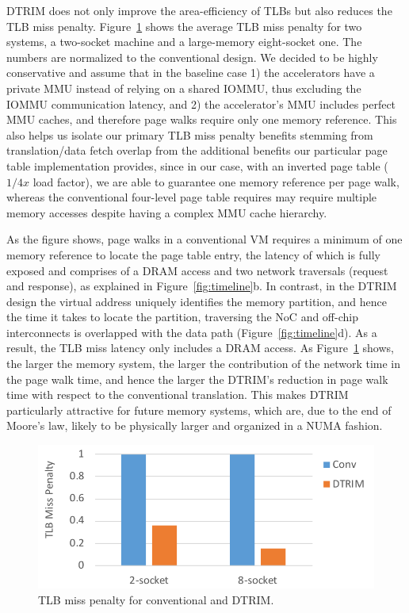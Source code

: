 DTRIM does not only improve the area-efficiency of TLBs but also reduces the TLB miss penalty. Figure~\ref{fig:penalty} shows the average TLB miss penalty for two systems, a two-socket machine and a large-memory eight-socket one. The numbers are normalized to the conventional design. We decided to be highly conservative and assume that in the baseline case 1) the accelerators have a private MMU instead of relying on a shared IOMMU, thus excluding the IOMMU communication latency, and 2) the accelerator's MMU includes perfect MMU caches, and therefore page walks require only one memory reference. This also helps us isolate our primary TLB miss penalty benefits stemming from translation/data fetch overlap from the additional benefits our particular page table implementation provides, since in our case, with an inverted page table ($1/4x$ load factor), we are able to guarantee one memory reference per page walk, whereas the conventional four-level page table requires may require multiple memory accesses despite having a complex MMU cache hierarchy.

As the figure shows, page walks in a conventional VM requires a minimum of one memory reference to locate the page table entry, the latency of which is fully exposed and comprises of a DRAM access and two network traversals (request and response), as explained in Figure~\ref{fig:timeline}b. In contrast, in the DTRIM design the virtual address uniquely identifies the memory partition, and hence the time it takes to locate the partition, traversing the NoC and off-chip interconnects is overlapped with the data path (Figure~\ref{fig:timeline}d). As a result, the TLB miss latency only includes a DRAM access. As Figure~\ref{fig:penalty} shows, the larger the memory system, the larger the contribution of the network time in the page walk time, and hence the larger the DTRIM's reduction in page walk time with respect to the conventional translation. This makes DTRIM particularly attractive for future memory systems, which are, due to the end of Moore's law, likely to be physically larger and organized in a NUMA fashion.

\begin{figure}[t]
	\centering
	\includegraphics[width=1.0\columnwidth]{graphs/penalty.pdf}
	\caption{TLB miss penalty for conventional and DTRIM.}
	\label{fig:penalty}
\end{figure}



